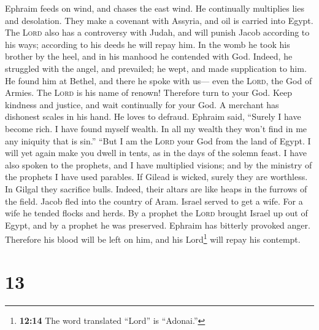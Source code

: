  Ephraim feeds on wind, and chases the east wind. He
continually multiplies lies and desolation. They make a covenant with
Assyria, and oil is carried into Egypt.  The \textsc{Lord}
also has a controversy with Judah, and will punish Jacob according to
his ways; according to his deeds he will repay him.  In
the womb he took his brother by the heel, and in his manhood he
contended with God.  Indeed, he struggled with the angel,
and prevailed; he wept, and made supplication to him. He found him at
Bethel, and there he spoke with us---  even the
\textsc{Lord}, the God of Armies. The \textsc{Lord} is his name of
renown!  Therefore turn to your God. Keep kindness and
justice, and wait continually for your God.  A merchant
has dishonest scales in his hand. He loves to defraud. 
Ephraim said, ``Surely I have become rich. I have found myself wealth.
In all my wealth they won't find in me any iniquity that is sin.''
 ``But I am the \textsc{Lord} your God from the land of
Egypt. I will yet again make you dwell in tents, as in the days of the
solemn feast.  I have also spoken to the prophets, and I
have multiplied visions; and by the ministry of the prophets I have used
parables.  If Gilead is wicked, surely they are
worthless. In Gilgal they sacrifice bulls. Indeed, their altars are like
heaps in the furrows of the field.  Jacob fled into the
country of Aram. Israel served to get a wife. For a wife he tended
flocks and herds.  By a prophet the \textsc{Lord} brought
Israel up out of Egypt, and by a prophet he was preserved.
 Ephraim has bitterly provoked anger. Therefore his blood
will be left on him, and his Lord\footnote{\textbf{12:14} The word
  translated ``Lord'' is ``Adonai.''} will repay his contempt.

\hypertarget{section-12}{%
\section{13}\label{section-12}}

